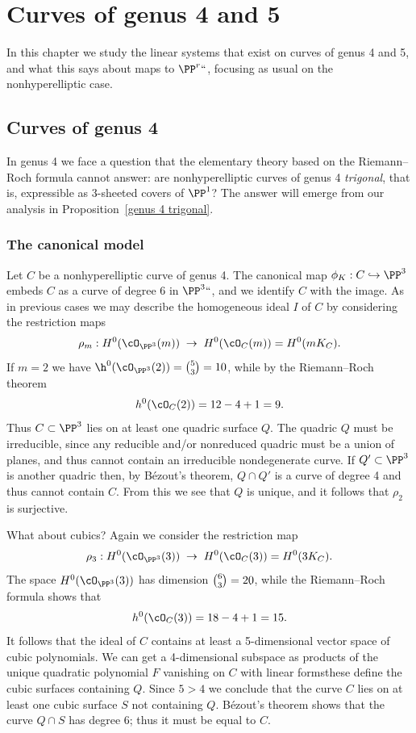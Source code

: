 
\chapter{Curves of genus 4 and 5}\label{genus 4, 5 Chapter}

In this chapter we
study
the linear systems that exist on curves of genus 4 and 5, and what this says
about maps to $\PP^r` `$, focusing as usual on the nonhyperelliptic case.

\section{Curves of genus 4}

In genus 4 we
face
%
a question that the elementary theory based on the Riemann--Roch
formula cannot answer: are nonhyperelliptic curves of genus 4
%
%
\emph{trigonal}, that is, expressible as 3-sheeted covers of $\PP^1$?
The answer will emerge from our analysis in
Proposition~\ref{genus 4 trigonal}.

\subsection*{The canonical model}

Let $C$ be a nonhyperelliptic curve of genus 4. The canonical map $\phi_K : C \hookrightarrow \PP^3$  embeds $C$ as a curve of degree 6 in $\PP^3` `$, and we identify $C$ with the image.  As in previous cases we may describe the homogeneous ideal  $I$ of $C$ by considering the restriction maps
$$
\rho_m : H^0(\cO_{\PP^3}(m)) \; \to \; H^0(\cO_{C}(m)) = H^0(mK_C).
$$
If
$m=2$ we have $\h^0(\cO_{\PP^3}(2)) = \tbinom{5}{3} = 10$, while by the
%
Riemann--Roch theorem
$$
h^0(\cO_C(2)) = 12 - 4 + 1 = 9.
$$
Thus $C \subset \PP^3$  lies on at least one quadric surface $Q$. The quadric $Q$ must be irreducible, since any reducible and/or nonreduced quadric must be a union of planes, and thus cannot contain an irreducible nondegenerate curve.
If $Q'\subset\nobreak \PP^3$ is another quadric then, by B\'ezout's theorem,
$Q\cap Q'$ is a curve of degree 4 and thus
cannot
contain $C$. From
this we see that $Q$ is unique, and it follows that $\rho_2$ is surjective.

What about cubics? Again we consider the restriction map
$$
\rho_3 : H^0(\cO_{\PP^3}(3)) \; \to \; H^0(\cO_{C}(3)) = H^0(3K_C).
$$
The space $H^0(\cO_{\PP^3}(3))$ has dimension $\tbinom{6}{3} = 20$, while  the Riemann--Roch formula shows that
$$
h^0(\cO_C(3)) = 18 - 4 + 1 = 15.
$$
It follows that the ideal of $C$ contains at least a 5-dimensional vector space of cubic polynomials. We can get a 4-dimensional subspace as products of the unique quadratic polynomial $F$ vanishing on $C$ with linear forms\emdash these define the cubic surfaces containing $Q$. Since $5 > 4$ we  conclude that the curve $C$ lies on at least one cubic surface $S$  not containing $Q$.
B\'ezout's theorem
%
shows that the curve $Q \cap S$ has degree 6; thus it must be equal to $C$.

